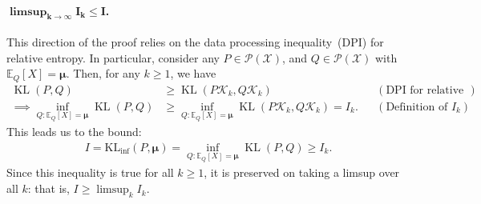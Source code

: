 \documentclass{article}
\theoremstyle{plain}
\theoremstyle{definition}
\newcommand{\KLinf}{\operatorname{KL_{inf}}}
\newcommand{\KL}{\operatorname{KL}}
\newcommand{\calP}{\mathcal P}
\newcommand{\calX}{\mathcal X}
\newcommand{\calK}{\mathcal{K}}
\newcommand{\boldmu}{\boldsymbol{\mu}}
\begin{document}
\paragraph{$\boldsymbol{\limsup_{k \to \infty} I_k \leq I}$.} This direction of the proof relies on the data processing inequality~(DPI) for relative entropy. In particular, consider any $P \in \calP(\calX)$, and $Q \in \calP(\calX)$ with $\mathbb{E}_Q[X]=\boldmu$. Then, for any $k \geq 1$, we have 
\begin{align}
\KL(P, Q) & \geq \KL( P \calK_k, Q \calK_k) && (\text{DPI for relative entropy}) \\
\implies \inf_{Q: \mathbb{E}_{Q}[X] = \boldmu} \KL(P, Q) & \geq \inf_{Q:\mathbb{E}_{Q}[X]=\boldmu} \KL(P \calK_k, Q \calK_k) = I_k. && (\text{Definition of $I_k$}) 
\end{align}
This leads us to the bound:  
\begin{align}
    I = \KLinf(P, \boldmu) = \inf_{Q: \mathbb{E}_Q[X]=\boldmu} \KL(P, Q) \geq  I_k. 
\end{align}
Since this inequality is true for all $k \geq 1$, it is preserved on taking a limsup over all $k$: that is, $I \geq \limsup_{k} I_k$. 
\end{document}
